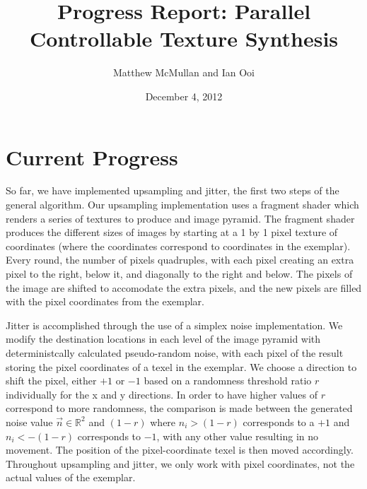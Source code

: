 \documentclass[12pt]{article}
\title{Progress Report: Parallel Controllable Texture Synthesis}
\author{Matthew McMullan and Ian Ooi}
\date{December 4, 2012}
\begin{document}
    \maketitle
    \section{Current Progress}
        So far, we have implemented upsampling and jitter, the first two steps of the general algorithm.  Our upsampling implementation uses a fragment shader which renders a series of textures to produce and image pyramid.  The fragment shader produces the different sizes of images by starting at a 1 by 1 pixel texture of coordinates (where the coordinates correspond to coordinates in the exemplar).  Every round, the number of pixels quadruples, with each pixel creating an extra pixel to the right, below it, and diagonally to the right and below.  The pixels of the image are shifted to accomodate the extra pixels, and the new pixels are filled with the pixel coordinates from the exemplar.
        
      Jitter is accomplished through the use of a simplex noise implementation. We modify the destination locations in each level of the image pyramid with deterministcally calculated pseudo-random noise, with each pixel of the result storing the pixel coordinates of a texel in the exemplar.  We choose a direction to shift the pixel, either $+1$ or $-1$ based on a randomness threshold ratio $r$ individually for the x and y directions.  In order to have higher values of $r$ correspond to more randomness, the comparison is made between the generated noise value $\vec{n} \in \mathbb{R}^2$ and $\left(1 - r \right)$ where $n_i > (1-r)$ corresponds to a $+1$ and $n_i < -(1-r)$ corresponds to $-1$, with any other value resulting in no movement.  The position of the pixel-coordinate texel is then moved accordingly.  Throughout upsampling and jitter, we only work with pixel coordinates, not the actual values of the exemplar.
\end{document}
